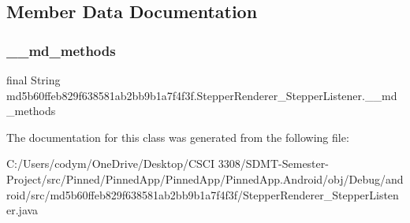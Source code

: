 \subsection{Member Data Documentation}
\mbox{\label{classmd5b60ffeb829f638581ab2bb9b1a7f4f3f_1_1_stepper_renderer___stepper_listener_a477983b1cb4ddb1d26a31bca1d1d5f02}} 
\subsubsection{\texorpdfstring{\+\_\+\+\_\+md\+\_\+methods}{\_\_md\_methods}}
{\footnotesize\ttfamily final String md5b60ffeb829f638581ab2bb9b1a7f4f3f.\+Stepper\+Renderer\+\_\+\+Stepper\+Listener.\+\_\+\+\_\+md\+\_\+methods\hspace{0.3cm}{\ttfamily [static]}}



The documentation for this class was generated from the following file\+:\begin{DoxyCompactItemize}
\item 
C\+:/\+Users/codym/\+One\+Drive/\+Desktop/\+C\+S\+C\+I 3308/\+S\+D\+M\+T-\/\+Semester-\/\+Project/src/\+Pinned/\+Pinned\+App/\+Pinned\+App/\+Pinned\+App.\+Android/obj/\+Debug/android/src/md5b60ffeb829f638581ab2bb9b1a7f4f3f/Stepper\+Renderer\+\_\+\+Stepper\+Listener.\+java\end{DoxyCompactItemize}
